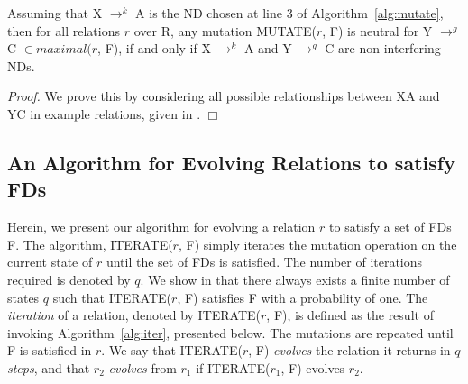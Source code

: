 \medskip


\begin{theorem}\label{theorem:neutral}
\begin{rm}
Assuming that X $\to^k$ A is the ND chosen at line 3 of 
Algorithm~\ref{alg:mutate}, then for all relations $r$ over R,
any mutation MUTATE($r$, F) is neutral for Y $\to^g$ C $\in maximal(r$, F),
if and only if X $\to^k$ A and Y $\to^g$ C are non-interfering NDs.
\end{rm}
\end{theorem}

{\em Proof.} We prove this by considering all possible relationships
between XA and YC in example relations, given in \cite{cl96}. $\Box$

\subsection{An Algorithm for Evolving Relations to satisfy FDs}
\label{sec:evolve}


Herein, we present our algorithm for evolving a relation $r$ to satisfy a set
of FDs F. The algorithm, ITERATE($r$, F) simply iterates 
the mutation operation on the current state of $r$ until the set of
FDs is satisfied. The number of iterations required is denoted by $q$.
We show in \cite{cl96} that there always exists a finite number of states $q$
such that ITERATE($r$, F) satisfies F with a probability of one.
The {\em iteration} of a relation, denoted by ITERATE($r$, F),
is defined as the result of invoking Algorithm~\ref{alg:iter},
presented below. The mutations are repeated until F is satisfied in $r$.
We say that ITERATE($r$, F) {\em evolves} the relation it returns
in $q$ {\em steps}, and that $r_2$ {\em evolves} from $r_1$
if ITERATE($r_1$, F) evolves $r_2$.

